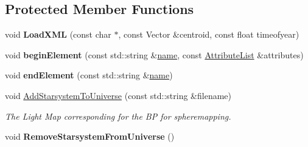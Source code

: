 \subsection*{Protected Member Functions}
\begin{DoxyCompactItemize}
\item 
void {\bfseries Load\+X\+ML} (const char $\ast$, const Vector \&centroid, const float timeofyear)\hypertarget{classStarSystem_a471c0a845cff3c39f976ca46e2634a17}{}\label{classStarSystem_a471c0a845cff3c39f976ca46e2634a17}

\item 
void {\bfseries begin\+Element} (const std\+::string \&\hyperlink{classStarSystem_a1ca90e6ba69744ed55bb6009fd000c2b}{name}, const \hyperlink{classXMLSupport_1_1AttributeList}{Attribute\+List} \&attributes)\hypertarget{classStarSystem_a05fe26c51ca300d3ea7c3b159ce6c3ab}{}\label{classStarSystem_a05fe26c51ca300d3ea7c3b159ce6c3ab}

\item 
void {\bfseries end\+Element} (const std\+::string \&\hyperlink{classStarSystem_a1ca90e6ba69744ed55bb6009fd000c2b}{name})\hypertarget{classStarSystem_acd6f1ad027eeb318a6c4d719249a0131}{}\label{classStarSystem_acd6f1ad027eeb318a6c4d719249a0131}

\item 
void \hyperlink{classStarSystem_a13fddd8b91153dd5d32e23f428f91e6b}{Add\+Starsystem\+To\+Universe} (const std\+::string \&filename)\hypertarget{classStarSystem_a13fddd8b91153dd5d32e23f428f91e6b}{}\label{classStarSystem_a13fddd8b91153dd5d32e23f428f91e6b}

\begin{DoxyCompactList}\small\item\em The Light Map corresponding for the BP for spheremapping. \end{DoxyCompactList}\item 
void {\bfseries Remove\+Starsystem\+From\+Universe} ()\hypertarget{classStarSystem_a2bac97e7feab0352c9395bc090b17962}{}\label{classStarSystem_a2bac97e7feab0352c9395bc090b17962}

\end{DoxyCompactItemize}
